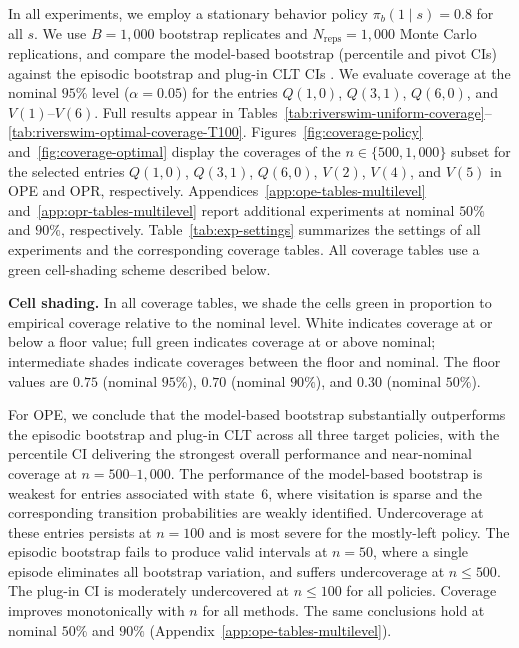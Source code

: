 \documentclass{article}
\numberwithin{equation}{section}
\begin{document}
In all experiments, we employ a stationary behavior policy $\pi_b(1\mid s)=0.8$ for all $s$. 
We use $B=1{,}000$ bootstrap replicates and $N_{\mathrm{reps}}=1{,}000$ Monte Carlo replications, and compare the model-based bootstrap (percentile and pivot CIs) against the episodic bootstrap \citep{hao2021bootstrapping} and plug-in CLT CIs \citep{zhu2024uncertainty, su2025centrallimittheoremstransition}.
We evaluate coverage at the nominal $95\%$ level ($\alpha=0.05$) for the entries $Q(1,0)$, $Q(3,1)$, $Q(6,0)$, and $V(1)$--$V(6)$. Full results appear in Tables~\ref{tab:riverswim-uniform-coverage}--\ref{tab:riverswim-optimal-coverage-T100}.
Figures~\ref{fig:coverage-policy} and~\ref{fig:coverage-optimal} display the coverages of the $n\in\{500,1{,}000\}$ subset for the selected entries $Q(1,0)$, $Q(3,1)$, $Q(6,0)$, $V(2)$, $V(4)$, and $V(5)$ in OPE and OPR, respectively.
Appendices~\ref{app:ope-tables-multilevel} and~\ref{app:opr-tables-multilevel} report additional experiments at nominal $50\%$ and $90\%$, respectively.
Table~\ref{tab:exp-settings} summarizes the settings of all experiments and the corresponding coverage tables. 
All coverage tables use a green cell-shading scheme described below.

\textbf{Cell shading.}
In all coverage tables, we shade the cells green in proportion to empirical coverage
relative to the nominal level.
White indicates coverage at or below a floor value; full green indicates coverage at
or above nominal; intermediate shades indicate coverages between the floor and nominal.
The floor values are $0.75$ (nominal $95\%$), $0.70$ (nominal $90\%$), and $0.30$
(nominal $50\%$).


For OPE, we conclude that the model-based bootstrap substantially outperforms the episodic bootstrap and plug-in CLT across all three target policies, with the percentile CI delivering the strongest overall performance and near-nominal coverage at $n=500$--$1{,}000$.
The performance of the model-based bootstrap is weakest for entries associated with state~$6$, where visitation is sparse and the corresponding transition probabilities are weakly identified. Undercoverage at these entries persists at $n=100$ and is most severe for the mostly-left policy.
The episodic bootstrap fails to produce valid intervals at $n=50$, where a single episode eliminates all bootstrap variation, and suffers undercoverage at $n \le 500$.
The plug-in CI is moderately undercovered at $n\le 100$ for all policies.
Coverage improves monotonically with $n$ for all methods.
The same conclusions hold at nominal $50\%$ and $90\%$ (Appendix~\ref{app:ope-tables-multilevel}).
\end{document}
